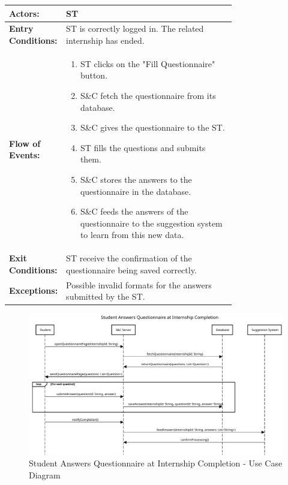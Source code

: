 \begin{center}
    \begin{longtable}{|l|p{0.75\linewidth}|}
        \hline
        \textbf{Actors:}           & ST                                                                                                     \\
        \hline
        \textbf{Entry Conditions:} & ST is correctly logged in. The related internship has ended.                                           \\
        \hline
        \textbf{Flow of Events:}   & \begin{enumerate}
                                         \item ST clicks on the "Fill Questionnaire" button.
                                         \item S\&C fetch the questionnaire from its database.
                                         \item S\&C gives the questionnaire to the ST.
                                         \item ST fills the questions and submits them.
                                         \item S\&C stores the answers to the questionnaire in the database.
                                         \item S\&C feeds the answers of the questionnaire to the suggestion system to learn from this new data.
                                     \end{enumerate} \\
        \hline
        \textbf{Exit Conditions:}  & ST receive the confirmation of the questionnaire being saved correctly.                                \\
        \hline
        \textbf{Exceptions:}       & Possible invalid formats for the answers submitted by the ST.                                          \\
        \hline
    \end{longtable}
\end{center}

\begin{figure}[H]
    \centering
    \includegraphics[width=1.0\textwidth]{Images/UC_7.pdf}
    \caption{Student Answers Questionnaire at Internship Completion - Use Case Diagram}
    \label{fig:use-case-diagram-7}
\end{figure}

